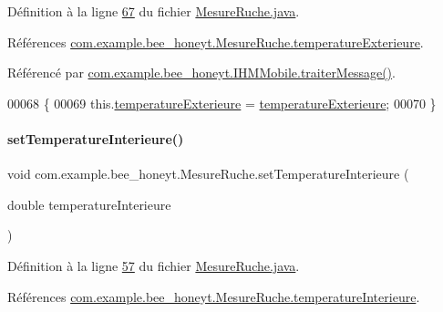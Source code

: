 Définition à la ligne \hyperlink{_mesure_ruche_8java_source_l00067}{67} du fichier \hyperlink{_mesure_ruche_8java_source}{Mesure\+Ruche.\+java}.



Références \hyperlink{_mesure_ruche_8java_source_l00018}{com.\+example.\+bee\+\_\+honeyt.\+Mesure\+Ruche.\+temperature\+Exterieure}.



Référencé par \hyperlink{_i_h_m_mobile_8java_source_l00374}{com.\+example.\+bee\+\_\+honeyt.\+I\+H\+M\+Mobile.\+traiter\+Message()}.


\begin{DoxyCode}
00068     \{
00069         this.\hyperlink{classcom_1_1example_1_1bee__honeyt_1_1_mesure_ruche_ac13ff0ed6c96cf755097510acf202521}{temperatureExterieure} = \hyperlink{classcom_1_1example_1_1bee__honeyt_1_1_mesure_ruche_ac13ff0ed6c96cf755097510acf202521}{temperatureExterieure};
00070     \}
\end{DoxyCode}
\mbox{\label{classcom_1_1example_1_1bee__honeyt_1_1_mesure_ruche_a5364a38970b37df66bb8cb6f5b3d3741}} 
\paragraph{\texorpdfstring{set\+Temperature\+Interieure()}{setTemperatureInterieure()}}
{\footnotesize\ttfamily void com.\+example.\+bee\+\_\+honeyt.\+Mesure\+Ruche.\+set\+Temperature\+Interieure (\begin{DoxyParamCaption}\item[{double}]{temperature\+Interieure }\end{DoxyParamCaption})}



Définition à la ligne \hyperlink{_mesure_ruche_8java_source_l00057}{57} du fichier \hyperlink{_mesure_ruche_8java_source}{Mesure\+Ruche.\+java}.



Références \hyperlink{_mesure_ruche_8java_source_l00017}{com.\+example.\+bee\+\_\+honeyt.\+Mesure\+Ruche.\+temperature\+Interieure}.



